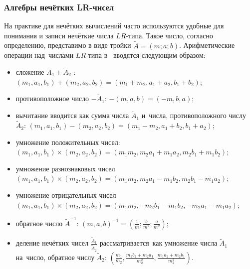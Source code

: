 \subsubsection*{Алгебры нечётких LR-чисел}

На практике для нечётких вычислений часто используются удобные для понимания и записи нечёткие числа $LR$-типа. Такое число, согласно определению, представимо в виде тройки $\tilde{A}=\left( m;a;b \right)$. Арифметические операции над~числами $LR$-типа в~\cite{Pospelov, Yakhyaeva} вводятся следующим образом:
\begin{itemize}
	\item сложение ${{\tilde{A}}_{1}}+{{\tilde{A}}_{2}}$ : $\left( {{m}_{1}},{{a}_{1}},{{b}_{1}} \right)+\left( {{m}_{2}},{{a}_{2}},{{b}_{2}} \right)=\left( {{m}_{1}}+{{m}_{2}},{{a}_{1}}+{{a}_{2}},{{b}_{1}}+{{b}_{2}} \right)$;
	\item противоположное число $-{{\tilde{A}}_{1}}$: $-\left( m,a,b \right)=\left( -m,b,a \right)$;
	\item вычитание вводится как сумма числа ${{\tilde{A}}_{1}}$ и~числа, противоположного числу ${{\tilde{A}}_{2}}$: $\left( {{m}_{1}},{{a}_{1}},{{b}_{1}} \right)-\left( {{m}_{2}},{{a}_{2}},{{b}_{2}} \right)=\left( {{m}_{1}}-{{m}_{2}},{{a}_{1}}+{{b}_{2}},{{b}_{1}}+{{a}_{2}} \right)$;
	\item умножение положительных чисел: $\left( {{m}_{1}},{{a}_{1}},{{b}_{1}} \right)\times \left( {{m}_{2}},{{a}_{2}},{{b}_{2}} \right)=\left( {{m}_{1}}{{m}_{2}},{{m}_{2}}{{a}_{1}}+{{m}_{1}}{{a}_{2}},{{m}_{2}}{{b}_{1}}+{{m}_{1}}{{b}_{2}} \right)$;
	\item умножение разнознаковых чисел $\left( {{m}_{1}},{{a}_{1}},{{b}_{1}} \right)\times \left( {{m}_{2}},{{a}_{2}},{{b}_{2}} \right)=\left( {{m}_{1}}{{m}_{2}},{{m}_{2}}{{a}_{1}}-{{m}_{1}}{{b}_{2}},{{m}_{2}}{{b}_{1}}-{{m}_{1}}{{a}_{2}} \right)$;
	\item умножение отрицательных чисел $\left( {{m}_{1}},{{a}_{1}},{{b}_{1}} \right)\times \left( {{m}_{2}},{{a}_{2}},{{b}_{2}} \right)=\left( {{m}_{1}}{{m}_{2}},-{{m}_{2}}{{b}_{1}}-{{m}_{1}}{{b}_{2}},-{{m}_{2}}{{a}_{1}}-{{m}_{1}}{{a}_{2}} \right)$;
	\item обратное число $\displaystyle {\tilde A}^{-1}$: ${{\left( m,a,b \right)}^{-1}}=\left( \frac{1}{m};\frac{b}{{{m}^{2}}};\frac{a}{{{m}^{2}}} \right)$;
	\item деление нечётких чисел $\displaystyle \frac{{{{\tilde{A}}}_{1}}}{{{{\tilde{A}}}_{2}}}$ рассматривается~как умножение числа ${{\tilde{A}}_{1}}$ на~число, обратное числу ${{\tilde{A}}_{2}}$: $\displaystyle \left( \frac{{{m}_{1}}}{{{m}_{2}}},\frac{{{m}_{1}}{{b}_{2}}+{{m}_{2}}{{a}_{1}}}{m_{2}^{2}},\frac{{{m}_{1}}{{a}_{2}}+{{m}_{2}}{{b}_{1}}}{m_{2}^{2}} \right)$.
\end{itemize}

